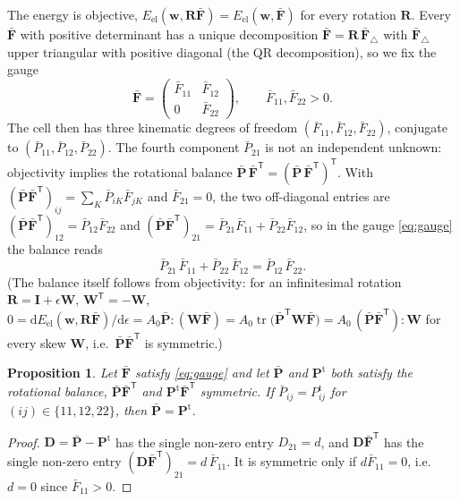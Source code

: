 \documentclass[11pt,a4paper]{article}
\newtheorem{proposition}{Proposition}
\newcommand{\Fb}{\bar{\mathbf F}}
\newcommand{\Pb}{\bar{\mathbf P}}
\newcommand{\Pt}{\mathbf P^{\mathrm t}}
\newcommand{\I}{\mathbf I}
\newcommand{\w}{\mathbf w}
\newcommand{\tr}{\operatorname{tr}}
\begin{document}
The energy is objective, \(E_{\mathrm{el}}(\w,\mathbf R\Fb)=E_{\mathrm{el}}(\w,\Fb)\) for every
rotation \(\mathbf R\). Every \(\Fb\) with positive determinant has a unique decomposition
\(\Fb=\mathbf R\,\Fb_{\triangle}\) with \(\Fb_\triangle\) upper triangular with positive diagonal
(the QR decomposition), so we fix the gauge
\begin{equation}
  \Fb=\begin{pmatrix}\bar F_{11}&\bar F_{12}\\0&\bar F_{22}\end{pmatrix},\qquad
  \bar F_{11},\bar F_{22}>0 .
  \label{eq:gauge}
\end{equation}
The cell then has three kinematic degrees of freedom \((\bar F_{11},\bar F_{12},\bar F_{22})\),
conjugate to \((\bar P_{11},\bar P_{12},\bar P_{22})\). The fourth component \(\bar P_{21}\) is not
an independent unknown: objectivity implies the rotational balance
\(\Pb\,\Fb^{\mathsf T}=(\Pb\,\Fb^{\mathsf T})^{\mathsf T}\). With
\((\Pb\Fb^{\mathsf T})_{ij}=\sum_K\bar P_{iK}\bar F_{jK}\) and \(\bar F_{21}=0\), the two off-diagonal
entries are \((\Pb\Fb^{\mathsf T})_{12}=\bar P_{12}\bar F_{22}\) and
\((\Pb\Fb^{\mathsf T})_{21}=\bar P_{21}\bar F_{11}+\bar P_{22}\bar F_{12}\), so in the gauge
\eqref{eq:gauge} the balance reads
\begin{equation}
  \bar P_{21}\,\bar F_{11}+\bar P_{22}\,\bar F_{12}=\bar P_{12}\,\bar F_{22}.
  \label{eq:P21}
\end{equation}
(The balance itself follows from objectivity: for an infinitesimal rotation
\(\mathbf R=\I+\epsilon\mathbf W\), \(\mathbf W^{\mathsf T}=-\mathbf W\),
\(0=\mathrm dE_{\mathrm{el}}(\w,\mathbf R\Fb)/\mathrm d\epsilon=A_0\Pb:(\mathbf W\Fb)
=A_0\tr\!\big(\Pb^{\mathsf T}\mathbf W\Fb\big)=A_0\,(\Pb\Fb^{\mathsf T}):\mathbf W\) for every skew
\(\mathbf W\), i.e.\ \(\Pb\Fb^{\mathsf T}\) is symmetric.)

\begin{proposition}\label{prop:full}
Let \(\Fb\) satisfy \eqref{eq:gauge} and let \(\Pb\) and \(\Pt\) both satisfy the rotational
balance, \(\Pb\Fb^{\mathsf T}\) and \(\Pt\Fb^{\mathsf T}\) symmetric. If
\(\bar P_{ij}=P^{\mathrm t}_{ij}\) for \((ij)\in\{11,12,22\}\), then \(\Pb=\Pt\).
\end{proposition}
\begin{proof}
\(\mathbf D=\Pb-\Pt\) has the single non-zero entry \(D_{21}=d\), and
\(\mathbf D\Fb^{\mathsf T}\) has the single non-zero entry \((\mathbf D\Fb^{\mathsf T})_{21}=d\,\bar
F_{11}\). It is symmetric only if \(d\bar F_{11}=0\), i.e.\ \(d=0\) since \(\bar F_{11}>0\).
\end{proof}
\end{document}
